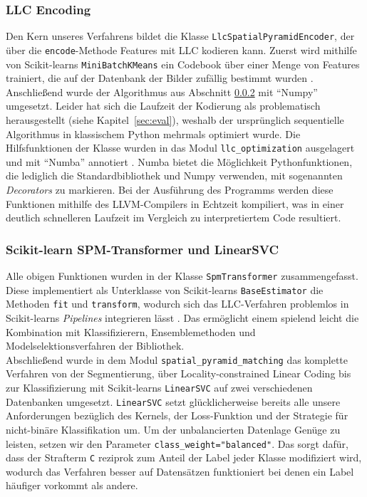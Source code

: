 \subsubsection{LLC Encoding}

Den Kern unseres Verfahrens bildet die Klasse \texttt{LlcSpatialPyramidEncoder}, der über die \texttt{encode}-Methode Features mit LLC kodieren kann. Zuerst wird mithilfe von Scikit-learns \texttt{MiniBatchKMeans} ein Codebook über einer Menge von Features trainiert, die auf der Datenbank der Bilder zufällig bestimmt wurden \cite{sklearn}. Anschließend wurde der Algorithmus aus Abschnitt \ref{sec:llc} mit \enquote{Numpy} umgesetzt. Leider hat sich die Laufzeit der Kodierung als problematisch herausgestellt (siehe Kapitel~\ref{sec:eval}), weshalb der ursprünglich sequentielle Algorithmus in klassischem Python mehrmals optimiert wurde. Die Hilfsfunktionen der Klasse wurden in das Modul \texttt{llc\_optimization} ausgelagert und mit \enquote{Numba} annotiert \cite{numba}. Numba bietet die Möglichkeit Pythonfunktionen, die lediglich die Standardbibliothek und Numpy verwenden, mit sogenannten \emph{Decorators} zu markieren. Bei der Ausführung des Programms werden diese Funktionen mithilfe des LLVM-Compilers in Echtzeit kompiliert, was in einer deutlich schnelleren Laufzeit im Vergleich zu interpretiertem Code resultiert.

\subsubsection{Scikit-learn SPM-Transformer und LinearSVC}
\label{sec:llc}

Alle obigen Funktionen wurden in der Klasse \texttt{SpmTransformer} zusammengefasst. Diese implementiert als Unterklasse von Scikit-learns \texttt{BaseEstimator} die Methoden \texttt{fit} und \texttt{transform}, wodurch sich das LLC-Verfahren problemlos in Scikit-learns \emph{Pipelines} integrieren lässt \cite{sklearn}. Das ermöglicht einem spielend leicht die Kombination mit Klassifizierern, Ensemblemethoden und Modelselektionsverfahren der Bibliothek. \\
Abschließend wurde in dem Modul \texttt{spatial\_pyramid\_matching} das komplette Verfahren von der Segmentierung, über Locality-constrained Linear Coding bis zur Klassifizierung mit Scikit-learns \texttt{LinearSVC} auf zwei verschiedenen Datenbanken umgesetzt. \texttt{LinearSVC} setzt glücklicherweise bereits alle unsere Anforderungen bezüglich des Kernels, der Loss-Funktion und der Strategie für nicht-binäre Klassifikation um. Um der unbalancierten Datenlage Genüge zu leisten, setzen wir den Parameter \texttt{class\_weight="balanced"}. Das sorgt dafür, dass der Strafterm \texttt{C} reziprok zum Anteil der Label jeder Klasse modifiziert wird, wodurch das Verfahren besser auf Datensätzen funktioniert bei denen ein Label häufiger vorkommt als andere.